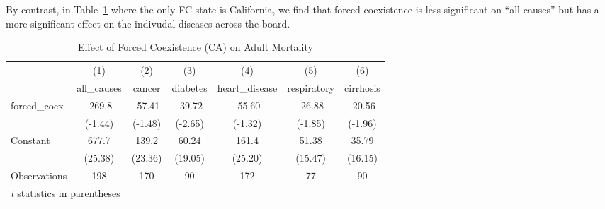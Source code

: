 \documentclass[12pt]{article}
\begin{document}
By contrast, in Table~\ref{adult1} where the only FC state is California, we find that forced coexistence is less significant on ``all causes'' but has a more significant effect on the indivudal diseases across the board.

\begin{table}[htbp]\centering \caption{Effect of Forced Coexistence (CA) on Adult Mortality\label{adult1}} \begin{tabular}{l*{6}{c}} \toprule
                    &\multicolumn{1}{c}{(1)}&\multicolumn{1}{c}{(2)}&\multicolumn{1}{c}{(3)}&\multicolumn{1}{c}{(4)}&\multicolumn{1}{c}{(5)}&\multicolumn{1}{c}{(6)}\\
                    &\multicolumn{1}{c}{all\_causes}&\multicolumn{1}{c}{cancer}&\multicolumn{1}{c}{diabetes}&\multicolumn{1}{c}{heart\_disease}&\multicolumn{1}{c}{respiratory}&\multicolumn{1}{c}{cirrhosis}\\
\midrule
forced\_coex         &      -269.8&      -57.41&      -39.72&      -55.60&      -26.88&      -20.56\\
                    &     (-1.44)&     (-1.48)&     (-2.65)&     (-1.32)&     (-1.85)&     (-1.96)\\
\addlinespace
Constant            &       677.7&       139.2&       60.24&       161.4&       51.38&       35.79\\
                    &     (25.38)&     (23.36)&     (19.05)&     (25.20)&     (15.47)&     (16.15)\\
\midrule
Observations        &         198&         170&          90&         172&          77&          90\\
\bottomrule
\multicolumn{7}{l}{\footnotesize \textit{t} statistics in parentheses}\\
\end{tabular}
\end{table}
\end{document}
